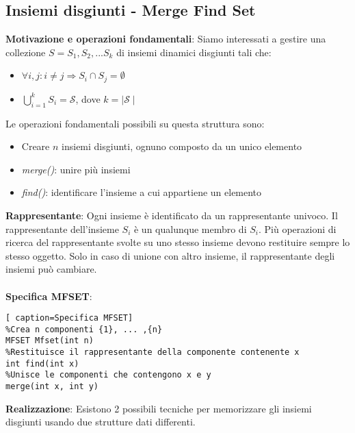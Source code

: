 \documentclass[../cheatSheetAlgoritmi.tex]{subfiles}
\begin{document}
\subsection{Insiemi disgiunti - Merge Find Set}
\textbf{Motivazione e operazioni fondamentali}: Siamo interessati a gestire una collezione $S = {S_1, S_2, ...S_k}$ di insiemi dinamici disgiunti tali che: 
\begin{itemize}
	\item $\forall i,j : i \neq j \Rightarrow S_i \cap S_j = \emptyset$ 
	\item $\bigcup\limits_{i=1}^{k} S_i = \mathcal{S}$, dove $k =\mid \mathcal{S} \mid$
\end{itemize}
Le operazioni fondamentali possibili su questa struttura sono:
\begin{itemize}
	\item Creare $n$ insiemi disgiunti, ognuno composto da un unico elemento
	\item \emph{merge()}: unire più insiemi
	\item \emph{find()}: identificare l'insieme a cui appartiene un elemento\\
\end{itemize}
\textbf{Rappresentante}: Ogni insieme è identificato da un rappresentante univoco. Il rappresentante dell'insieme $S_i$ è un qualunque membro di $S_i$. Più operazioni di ricerca del rappresentante svolte su uno stesso insieme devono restituire sempre lo stesso oggetto. Solo in caso di unione con altro insieme, il rappresentante degli insiemi può cambiare.\\\\
\textbf{Specifica MFSET}:
\begin{lstlisting}[ caption=Specifica MFSET]
%Crea n componenti {1}, ... ,{n}
MFSET Mfset(int n)
%Restituisce il rappresentante della componente contenente x
int find(int x)
%Unisce le componenti che contengono x e y
merge(int x, int y)
\end{lstlisting}
\textbf{Realizzazione}: Esistono 2 possibili tecniche per memorizzare gli insiemi disgiunti usando due strutture dati differenti.
\end{document}
